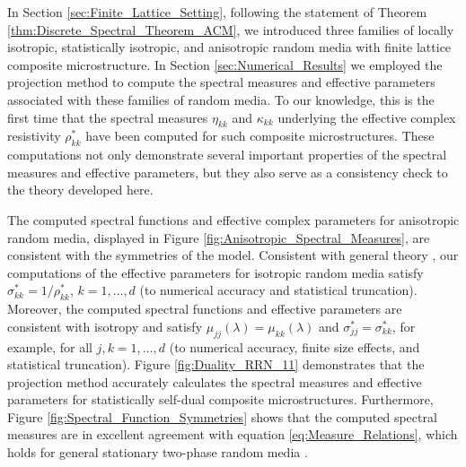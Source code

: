 \documentclass{cmslatex}
\begin{document}
In Section \ref{sec:Finite_Lattice_Setting}, following the statement
of Theorem \ref{thm:Discrete_Spectral_Theorem_ACM}, we introduced three 
families of locally isotropic, statistically isotropic, and
anisotropic random media with finite lattice composite microstructure. In Section
\ref{sec:Numerical_Results} we employed the projection method to
compute the spectral measures and effective parameters associated with
these families of random media. To our knowledge, this is the first
time that the spectral measures $\eta_{kk}$ and $\kappa_{kk}$ underlying the
effective complex resistivity $\rho^*_{kk}$ have been computed for such
composite microstructures. These computations not only demonstrate
several important properties of the spectral measures and effective
parameters, but they also serve as a consistency check to the theory
developed here. 



The computed spectral functions and effective complex parameters for
anisotropic random media, displayed in Figure
\ref{fig:Anisotropic_Spectral_Measures},  are consistent with the
symmetries of the model. Consistent with general theory
\cite{MILTON:2002:TC}, our computations of the effective parameters
for isotropic random media 
satisfy $\sigma^*_{kk}=1/\rho^*_{kk}$, $k=1,\ldots,d$ (to numerical accuracy and
statistical truncation). Moreover, the computed spectral functions and
effective parameters are consistent with isotropy and satisfy
$\mu_{jj}(\lambda)=\mu_{kk}(\lambda)$ and $\sigma^*_{jj}=\sigma^*_{kk}$, for example, for all
$j,k=1,\ldots,d$ (to numerical accuracy, finite size effects, and
statistical truncation). Figure
\ref{fig:Duality_RRN_11} demonstrates that the projection method
accurately calculates the spectral measures and 
effective parameters for statistically self-dual composite
microstructures. Furthermore, Figure
\ref{fig:Spectral_Function_Symmetries} shows that the computed 
spectral measures are in excellent agreement with equation
\eqref{eq:Measure_Relations}, which holds for general stationary
two-phase random media \cite{Murphy:JMP:063506}. 
\end{document}
